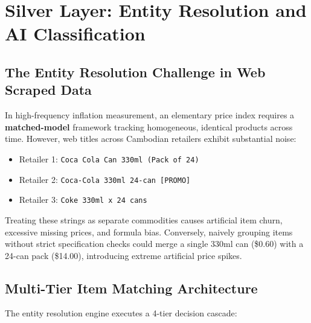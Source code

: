 \documentclass[11pt,a4paper]{article}
\begin{document}
\section{Silver Layer: Entity Resolution and AI Classification}

\subsection{The Entity Resolution Challenge in Web Scraped Data}
In high-frequency inflation measurement, an elementary price index requires a \textbf{matched-model} framework tracking homogeneous, identical products across time. However, web titles across Cambodian retailers exhibit substantial noise:
\begin{itemize}[noitemsep]
    \item Retailer 1: \texttt{Coca Cola Can 330ml (Pack of 24)}
    \item Retailer 2: \texttt{Coca-Cola 330ml 24-can [PROMO]}
    \item Retailer 3: \texttt{Coke 330ml x 24 cans}
\end{itemize}
Treating these strings as separate commodities causes artificial item churn, excessive missing prices, and formula bias. Conversely, naively grouping items without strict specification checks could merge a single 330ml can (\$0.60) with a 24-can pack (\$14.00), introducing extreme artificial price spikes.

\subsection{Multi-Tier Item Matching Architecture}
The entity resolution engine executes a 4-tier decision cascade:
\end{document}
